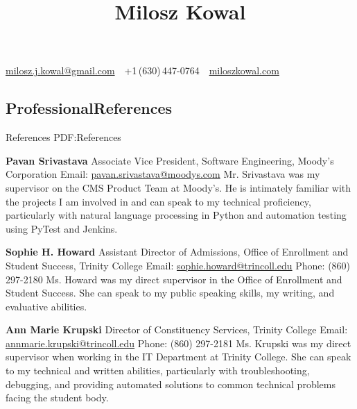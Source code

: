 \documentclass[letterpaper,10pt,oneside]{article}
\newcommand{\CVAuthor}{Milosz Kowal}
\newcommand{\CVWebpage}{https://miloszkowal.com}
\begin{document}

\title{\CVAuthor}

\begin{subtitle}
\begin{comment}
\end{comment}
\href{mailto:milosz.j.kowal@gmail.com}
{milosz.j.kowal@gmail.com}
\,\SubBulletSymbol\,
+1\,(630)\,447-0764
\,\SubBulletSymbol\,
\href{\CVWebpage}
{miloszkowal.com}
\end{subtitle}

\begin{body}



\section
{Professional\newline References}
{References}
{PDF:References}

{\textbf{Pavan Srivastava}}
\hfill
\GapNoBreak
\BulletItem
Associate Vice President, Software Engineering, Moody's Corporation
\BulletItem
Email: \href{mailto:pavan.srivastava@moodys.com}{pavan.srivastava@moodys.com}
\BulletItem
Mr. Srivastava was my supervisor on the CMS Product Team at Moody's. He is intimately familiar with the projects I am involved in and can speak to my technical proficiency, particularly with natural language processing in Python and automation testing using PyTest and Jenkins.

\BigGapNoBreak

{\textbf{Sophie H. Howard}}
\hfill
\GapNoBreak
\BulletItem
Assistant Director of Admissions, Office of Enrollment and Student Success, Trinity College
\BulletItem
Email: \href{mailto:sophie.howard@trincoll.edu}{sophie.howard@trincoll.edu}
\BulletItem
Phone: (860) 297-2180
\BulletItem
Ms. Howard was my direct supervisor in the Office of Enrollment and Student Success. She can speak to my public speaking skills, my writing, and evaluative abilities.

\BigGapNoBreak

{\textbf{Ann Marie Krupski}}
\hfill
\GapNoBreak
\BulletItem
Director of Constituency Services, Trinity College
\BulletItem
Email: \href{mailto:annmarie.krupski@trincoll.edu}{annmarie.krupski@trincoll.edu}
\BulletItem
Phone: (860) 297-2181
\BulletItem
Ms. Krupski was my direct supervisor when working in the IT Department at Trinity College. She can speak to my technical and written abilities, particularly with troubleshooting, debugging, and providing automated solutions to common technical problems facing the student body.


\end{body}
\end{document}
